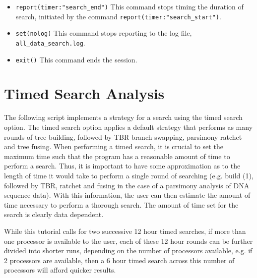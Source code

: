 \begin{itemize}
{graphconsensus,"all\_trees\_diag.txt",diagnosis)} This command
produces a series of outputs of the results of the search. It
includes a file containing best trees in parenthetical notation
(\texttt{all\_trees.tre}) and their costs (\texttt{trees:(total)}),
a graphical representation (in PDF format) of the strict consensus
(\texttt{all\_trees\_cs.pdf}), and the diagnoses for all best trees
(\texttt{all\_trees\_diag.txt}).  
\item \texttt{report(timer:"search\_end")} This command stops timing the
duration of search, initiated by the command \texttt{report(timer:"search\_start")}.  
\item \texttt{set(nolog)} This command stops reporting to the log file,
\texttt{all\_data\_search.log}.  
\item \texttt{exit()} This command ends the \poy session.  
\end{itemize}



\section {Timed Search Analysis}{\label {tutorial2}}

The following script implements a strategy for a  search
using the timed search option.  The timed search option applies a
default strategy that performs as many rounds of tree building,
followed by TBR branch swapping, parsimony ratchet and tree fusing.
When performing a timed search, it is crucial to set the maximum
time such that the program has a reasonable amount of time to perform
a search.  Thus, it is important to have some approximation as to
the length of time it would take to perform a single round of
searching (e.g. build (1), followed by TBR, ratchet and fusing in
the case of a parsimony analysis of DNA sequence data).  With this
information, the user can then estimate the amount of time necessary
to perform a thorough search. The amount of time set for the search
is clearly data dependent.

While this tutorial calls for two successive 12 hour timed searches,
if more than one processor is available to the user, each of these
12 hour rounds can be further divided into shorter runs, depending
on the number of processors available, e.g. if 2 processors are
available, then a 6 hour timed search across this number of processors
will afford quicker results.


